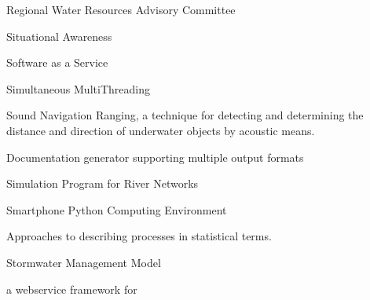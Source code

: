 \documentclass[letterpaper,12pt,english,openany,oneside]{sphinxmanual}
\begin{document}
\begin{description}
\sphinxAtStartPar
Regional Water Resources Advisory Committee

\sphinxAtStartPar
Situational Awareness

\sphinxAtStartPar
Software as a Service

\sphinxAtStartPar
Simultaneous Multi\sphinxhyphen{}Threading

\sphinxAtStartPar
Sound Navigation Ranging, a technique for detecting and determining the distance and direction of underwater objects by acoustic means.

\sphinxAtStartPar
Documentation generator supporting multiple output formats

\sphinxAtStartPar
Simulation Program for River Networks

\sphinxAtStartPar
Smartphone Python Computing Environment

\sphinxAtStartPar
Approaches to describing processes in statistical terms.

\sphinxAtStartPar
Stormwater Management Model

\sphinxAtStartPar
a webservice {\hyperref[\detokenize{glossary:term-API}]{}} framework for {\hyperref[\detokenize{glossary:term-Django}]{}}


\end{description}
\end{document}
